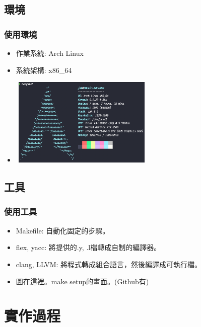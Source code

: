 \documentclass{beamer}
\begin{document}
\subsection{環境}
\begin{frame}
  \frametitle{使用環境}
  \begin{itemize}
    \item 作業系統: Arch Linux %
    \item 系統架構: x86\_64
    \item 
\includegraphics[width=260,height=160]{images/OS_INFO.png}
  \end{itemize}
\end{frame}

\subsection{工具}
\begin{frame}
  \frametitle{使用工具}
  \begin{itemize}
    \item Makefile: 自動化固定的步驟。
    \item flex, yacc: 將提供的.y, .l檔轉成自制的編譯器。
    \item clang, LLVM: 將程式轉成組合語言，然後編譯成可執行檔。
    \item 圖在這裡。make setup的畫面。(Github有)
  \end{itemize}
\end{frame}

\section{實作過程}
\end{document}
